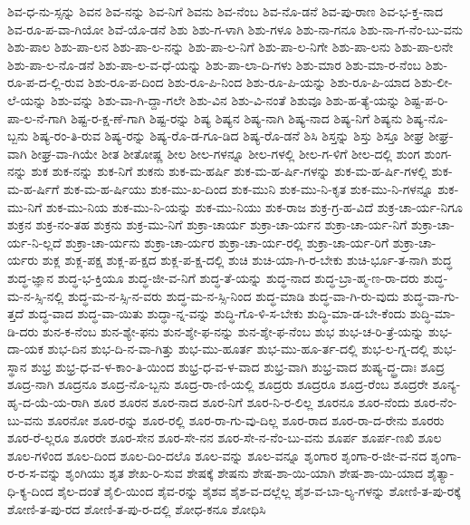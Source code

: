 {ಶಿವ-ಧ-ನು-ಸ್ಸನ್ನು
ಶಿವನ
ಶಿವ-ನನ್ನು
ಶಿವ-ನಿಗೆ
ಶಿವನು
ಶಿವ-ನೆಂಬ
ಶಿವ-ನೊ-ಡನೆ
ಶಿವ-ಪು-ರಾಣ
ಶಿವ-ಭ-ಕ್ತ-ನಾದ
ಶಿವ-ರೂ-ಪ-ವಾ-ಗಿಯೋ
ಶಿವೆ-ಯೊ-ಡನೆ
ಶಿಶು
ಶಿಶು-ಗ-ಳಾಗಿ
ಶಿಶು-ಗಳೂ
ಶಿಶು-ನಾ-ಗನೂ
ಶಿಶು-ನಾ-ಗ-ನೆಂ-ಬು-ವನು
ಶಿಶು-ಪಾಲ
ಶಿಶು-ಪಾ-ಲನ
ಶಿಶು-ಪಾ-ಲ-ನನ್ನು
ಶಿಶು-ಪಾ-ಲ-ನಿಗೆ
ಶಿಶು-ಪಾ-ಲ-ನಿಗೇ
ಶಿಶು-ಪಾ-ಲನು
ಶಿಶು-ಪಾ-ಲನೇ
ಶಿಶು-ಪಾ-ಲ-ನೊ-ಡನೆ
ಶಿಶು-ಪಾ-ಲ-ವ-ಧೆ-ಯನ್ನು
ಶಿಶು-ಪಾ-ಲಾ-ದಿ-ಗಳು
ಶಿಶು-ಮಾರ
ಶಿಶು-ಮಾ-ರ-ನೆಂಬ
ಶಿಶು-ರೂ-ಪ-ದ-ಲ್ಲಿ-ರುವ
ಶಿಶು-ರೂ-ಪ-ದಿಂದ
ಶಿಶು-ರೂ-ಪಿ-ನಿಂದ
ಶಿಶು-ರೂ-ಪಿ-ಯನ್ನು
ಶಿಶು-ರೂ-ಪಿ-ಯಾದ
ಶಿಶು-ಲೀ-ಲೆ-ಯನ್ನು
ಶಿಶು-ವನ್ನು
ಶಿಶು-ವಾ-ಗಿ-ದ್ದಾ-ಗಲೇ
ಶಿಶು-ವಿನ
ಶಿಶು-ವಿ-ನಂತೆ
ಶಿಶುವೂ
ಶಿಶು-ಹ-ತ್ಯೆ-ಯನ್ನು
ಶಿಷ್ಟ-ಪ-ರಿ-ಪಾ-ಲ-ನೆ-ಗಾಗಿ
ಶಿಷ್ಟ-ರ-ಕ್ಷ-ಣೆ-ಗಾಗಿ
ಶಿಷ್ಟ-ರನ್ನು
ಶಿಷ್ಯ
ಶಿಷ್ಯನ
ಶಿಷ್ಯ-ನಾಗಿ
ಶಿಷ್ಯ-ನಾದ
ಶಿಷ್ಯ-ನಿಗೆ
ಶಿಷ್ಯನು
ಶಿಷ್ಯ-ನೊ-ಬ್ಬನು
ಶಿಷ್ಯ-ರಂ-ತಿ-ರುವ
ಶಿಷ್ಯ-ರನ್ನು
ಶಿಷ್ಯ-ರೊ-ಡ-ಗೂ-ಡಿದ
ಶಿಷ್ಯ-ರೊ-ಡನೆ
ಶಿಸಿ
ಶಿಸ್ತನ್ನು
ಶಿಸ್ತು
ಶಿಸ್ತೂ
ಶೀಘ್ರ
ಶೀಘ್ರ-ವಾಗಿ
ಶೀಘ್ರ-ವಾ-ಗಿಯೇ
ಶೀತ
ಶೀತೋಷ್ಣ
ಶೀಲ
ಶೀಲ-ಗಳನ್ನೂ
ಶೀಲ-ಗಳಲ್ಲಿ
ಶೀಲ-ಗ-ಳಿಗೆ
ಶೀಲ-ದಲ್ಲಿ
ಶುಂಗ
ಶುಂಗ-ನನ್ನು
ಶುಕ
ಶುಕ-ನನ್ನು
ಶುಕ-ನಿಗೆ
ಶುಕನು
ಶುಕ-ಮ-ಹರ್ಷಿ
ಶುಕ-ಮ-ಹ-ರ್ಷಿ-ಗಳನ್ನು
ಶುಕ-ಮ-ಹ-ರ್ಷಿ-ಗಳಲ್ಲಿ
ಶುಕ-ಮ-ಹ-ರ್ಷಿಗೆ
ಶುಕ-ಮ-ಹ-ರ್ಷಿಯು
ಶುಕ-ಮು-ಖ-ದಿಂದ
ಶುಕ-ಮುನಿ
ಶುಕ-ಮು-ನಿ-ಕೃತ
ಶುಕ-ಮು-ನಿ-ಗಳನ್ನೂ
ಶುಕ-ಮು-ನಿಗೆ
ಶುಕ-ಮು-ನಿಯ
ಶುಕ-ಮು-ನಿ-ಯನ್ನು
ಶುಕ-ಮು-ನಿಯು
ಶುಕ-ರಾಜ
ಶುಕ್ರ-ಗ್ರ-ಹ-ವಿದೆ
ಶುಕ್ರ-ಚಾ-ರ್ಯ-ನಿಗೂ
ಶುಕ್ರನ
ಶುಕ್ರ-ನಂ-ತಹ
ಶುಕ್ರನು
ಶುಕ್ರ-ಮು-ನಿಗೆ
ಶುಕ್ರಾ-ಚಾರ್ಯ
ಶುಕ್ರಾ-ಚಾ-ರ್ಯನ
ಶುಕ್ರಾ-ಚಾ-ರ್ಯ-ನಿಗೆ
ಶುಕ್ರಾ-ಚಾ-ರ್ಯ-ನಿ-ಲ್ಲದೆ
ಶುಕ್ರಾ-ಚಾ-ರ್ಯನು
ಶುಕ್ರಾ-ಚಾ-ರ್ಯರ
ಶುಕ್ರಾ-ಚಾ-ರ್ಯ-ರಲ್ಲಿ
ಶುಕ್ರಾ-ಚಾ-ರ್ಯ-ರಿಗೆ
ಶುಕ್ರಾ-ಚಾ-ರ್ಯರು
ಶುಕ್ಲ
ಶುಕ್ಲ-ಪಕ್ಷ
ಶುಕ್ಲ-ಪ-ಕ್ಷದ
ಶುಕ್ಲ-ಪ-ಕ್ಷ-ದಲ್ಲಿ
ಶುಚಿ
ಶುಚಿ-ಯಾ-ಗಿ-ರ-ಬೇಕು
ಶುಚಿ-ರ್ಭೂ-ತ-ನಾಗಿ
ಶುದ್ಧ
ಶುದ್ಧ-ಜ್ಞಾನ
ಶುದ್ಧ-ಭ-ಕ್ತಿಯೂ
ಶುದ್ಧ-ಜೀ-ವ-ನಿಗೆ
ಶುದ್ಧ-ತೆ-ಯನ್ನು
ಶುದ್ಧ-ನಾದ
ಶುದ್ಧ-ಬ್ರಾ-ಹ್ಮ-ಣ-ರಾ-ದರು
ಶುದ್ಧ-ಮ-ನ-ಸ್ಸಿ-ನಲ್ಲಿ
ಶುದ್ಧ-ಮ-ನ-ಸ್ಸಿ-ನ-ವರು
ಶುದ್ಧ-ಮ-ನ-ಸ್ಸಿ-ನಿಂದ
ಶುದ್ಧ-ಮಾಡಿ
ಶುದ್ಧ-ವಾ-ಗಿ-ರು-ವುದು
ಶುದ್ಧ-ವಾ-ಗು-ತ್ತದೆ
ಶುದ್ಧ-ವಾದ
ಶುದ್ಧ-ವಾ-ಯಿತು
ಶುದ್ಧಾ-ನ್ನ-ವನ್ನು
ಶುದ್ಧಿ-ಗೊ-ಳಿ-ಸ-ಬೇಕು
ಶುದ್ಧಿ-ಮಾ-ಡ-ಬೇ-ಕೆಂದು
ಶುದ್ಧಿ-ಮಾ-ಡಿ-ದರು
ಶುನ-ಕ-ನೆಂಬ
ಶುನ-ಶ್ಯೇ-ಫನು
ಶುನ-ಶ್ಶೇ-ಫ-ನನ್ನು
ಶುನ-ಶ್ಶೇ-ಫ-ನೆಂಬ
ಶುಭ
ಶುಭ-ಚ-ರಿ-ತ್ರೆ-ಯನ್ನು
ಶುಭ-ದಾ-ಯಕ
ಶುಭ-ದಿನ
ಶುಭ-ದಿ-ನ-ವಾ-ಗಿತ್ತು
ಶುಭ-ಮು-ಹೂರ್ತ
ಶುಭ-ಮು-ಹೂ-ರ್ತ-ದಲ್ಲಿ
ಶುಭ-ಲ-ಗ್ನ-ದಲ್ಲಿ
ಶುಭ-ಸ್ಥಾನ
ಶುಭ್ರ
ಶುಭ್ರ-ಧ-ವ-ಳ-ಕಾಂ-ತಿ-ಯಿಂದ
ಶುಭ್ರ-ಧ-ವ-ಳ-ವಾದ
ಶುಭ್ರ-ವಾಗಿ
ಶುಭ್ರ-ವಾದ
ಶುಷ್ಯ-ದ್ಧ್ರ-ದಾಃ
ಶೂದ್ರ
ಶೂದ್ರ-ನಾಗಿ
ಶೂದ್ರನೂ
ಶೂದ್ರ-ನೊ-ಬ್ಬನು
ಶೂದ್ರ-ರಾ-ಣಿ-ಯಲ್ಲಿ
ಶೂದ್ರರು
ಶೂದ್ರರೂ
ಶೂದ್ರ-ರೆಂಬ
ಶೂದ್ರರೇ
ಶೂನ್ಯ-ಹೃ-ದ-ಯೆ-ಯ-ರಾಗಿ
ಶೂರ
ಶೂರನ
ಶೂರ-ನಾದ
ಶೂರ-ನಿಗೆ
ಶೂರ-ನಿ-ರ-ಲಿಲ್ಲ
ಶೂರನೂ
ಶೂರ-ನೆಂದು
ಶೂರ-ನೆಂ-ಬು-ವನು
ಶೂರನೋ
ಶೂರ-ರನ್ನು
ಶೂರ-ರಲ್ಲಿ
ಶೂರ-ರಾ-ಗು-ವು-ದಿಲ್ಲ
ಶೂರ-ರಾದ
ಶೂರ-ರಾ-ದ-ರೇನು
ಶೂರರು
ಶೂರ-ರೆ-ಲ್ಲರೂ
ಶೂರರೇ
ಶೂರ-ಸೇನ
ಶೂರ-ಸೇ-ನನ
ಶೂರ-ಸೇ-ನ-ನೆಂ-ಬು-ವನು
ಶೂರ್ಪ
ಶೂರ್ಪ-ಣಖಿ
ಶೂಲ
ಶೂಲ-ಗಳಿಂದ
ಶೂಲ-ದಿಂದ
ಶೂಲ-ದಿಂ-ದಲೊ
ಶೂಲ-ವನ್ನು
ಶೂಲ-ವನ್ನೂ
ಶೃಂಗಾರ
ಶೃಂಗಾ-ರ-ಜೀ-ವ-ನದ
ಶೃಂಗಾ-ರ-ರ-ಸ-ವನ್ನು
ಶೃಂಗಿಯು
ಶೃತ
ಶೇಖ-ರಿ-ಸುವ
ಶೇಷಕ್ಕೆ
ಶೇಷನು
ಶೇಷ-ಶಾ-ಯಿ-ಯಾಗಿ
ಶೇಷ-ಶಾ-ಯಿ-ಯಾದ
ಶೈತ್ಯಾ-ಧಿ-ಕ್ಯ-ದಿಂದ
ಶೈಲ-ದಂತೆ
ಶೈಲಿ-ಯಿಂದ
ಶೈವ-ರನ್ನು
ಶೈಶವ
ಶೈಶ-ವ-ದಲ್ಲೆಲ್ಲ
ಶೈಶ-ವ-ಬಾ-ಲ್ಯ-ಗಳನ್ನು
ಶೋಣಿ-ತ-ಪು-ರಕ್ಕೆ
ಶೋಣಿ-ತ-ಪು-ರದ
ಶೋಣಿ-ತ-ಪು-ರ-ದಲ್ಲಿ
ಶೋಧ-ಕನೂ
ಶೋಧಿಸಿ
}
